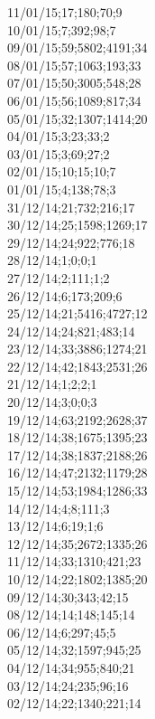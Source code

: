 11/01/15;17;180;70;9 \\
10/01/15;7;392;98;7 \\
09/01/15;59;5802;4191;34 \\
08/01/15;57;1063;193;33 \\
07/01/15;50;3005;548;28 \\
06/01/15;56;1089;817;34 \\
05/01/15;32;1307;1414;20 \\
04/01/15;3;23;33;2 \\
03/01/15;3;69;27;2 \\
02/01/15;10;15;10;7 \\
01/01/15;4;138;78;3 \\
31/12/14;21;732;216;17 \\
30/12/14;25;1598;1269;17 \\
29/12/14;24;922;776;18 \\
28/12/14;1;0;0;1 \\
27/12/14;2;111;1;2 \\
26/12/14;6;173;209;6 \\
25/12/14;21;5416;4727;12 \\
24/12/14;24;821;483;14 \\
23/12/14;33;3886;1274;21 \\
22/12/14;42;1843;2531;26 \\
21/12/14;1;2;2;1 \\
20/12/14;3;0;0;3 \\
19/12/14;63;2192;2628;37 \\
18/12/14;38;1675;1395;23 \\
17/12/14;38;1837;2188;26 \\
16/12/14;47;2132;1179;28 \\
15/12/14;53;1984;1286;33 \\
14/12/14;4;8;111;3 \\
13/12/14;6;19;1;6 \\
12/12/14;35;2672;1335;26 \\
11/12/14;33;1310;421;23 \\
10/12/14;22;1802;1385;20 \\
09/12/14;30;343;42;15 \\
08/12/14;14;148;145;14 \\
06/12/14;6;297;45;5 \\
05/12/14;32;1597;945;25 \\
04/12/14;34;955;840;21 \\
03/12/14;24;235;96;16 \\
02/12/14;22;1340;221;14 \\

